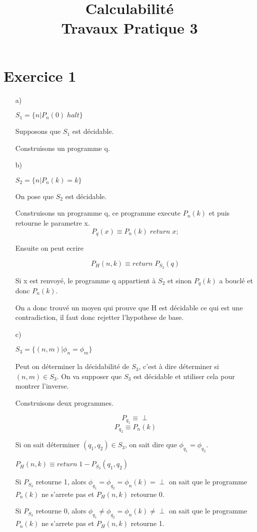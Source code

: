 \documentclass[a4paper,onecolumn,11pt]{article}
\author{}
\title{Calculabilité\\Travaux Pratique 3}
\date{}
\begin{document}
\maketitle
\section*{Exercice 1}
\begin{itemize}
\item[a)]

$S_1 = \{n | P_n(0) \; halt\}$

Supposons que $S_1$ est décidable.

Construisons un programme q.

\item[b)]

$S_2 = \{n | P_n(k) = k\}$

On pose que $S_2$ est décidable.

Construisons un programme q, ce programme execute $P_n(k)$ et puis retourne le parametre x.
$$P_q(x) \equiv P_n(k) \; return \; x;$$

Ensuite on peut ecrire

$$P_H(n,k) \equiv return \; P_{S_2}(q)$$

Si x est renvoyé, le programme q appartient à $S_2$ et sinon $P_q(k)$ a bouclé et donc $P_n(k)$.

On a donc trouvé un moyen qui prouve que H est décidable ce qui est une contradiction, il faut donc rejetter l'hypothese de base.

\item[c)]

$S_3 = \{(n,m) | \phi_n = \phi_m\}$

Peut on déterminer la décidabilité de $S_3$, c'est à dire déterminer si $(n,m) \in S_3$. On va supposer que $S_3$ est décidable et utiliser cela pour montrer l'inverse.

Construisons deux programmes.

$$P_{q_1} \equiv \perp$$
$$P_{q_2} \equiv P_n(k)$$

Si on sait déterminer $(q_1, q_2) \in S_3$, on sait dire que $\phi_{q_1} = \phi_{q_2}$.

$P_H(n,k) \equiv return \; 1 - P_{S_3}(q_1, q_2)$

Si $P_{S_3}$ retourne 1, alors $\phi_{q_1} = \phi_{q_2} = \phi_n(k) = \perp$ on sait que le programme $P_n(k)$ ne s'arrete pas et $P_H(n,k)$ retourne 0.

Si $P_{S_3}$ retourne 0, alors $\phi_{q_1} \neq \phi_{q_2} = \phi_n(k) \neq \perp$ on sait que le programme $P_n(k)$ ne s'arrete pas et $P_H(n,k)$ retourne 1.


\end{itemize}
\end{document}
